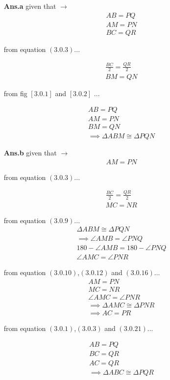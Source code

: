 \begin{enumerate}
	\item[\textbf{Ans.a}]	
	given that $\to$\\
	\begin{align}
	AB = PQ\\
	AM = PN\\
	BC = QR	
	\end{align}
	
	from equation $\left(3.0.3\right)$...
	
	\begin{align}
	\frac{BC}{2} = \frac{QR}{2} \\
	BM = QN
	\end{align}
	
	from fig $\left[3.0.1\right]$ and $\left[3.0.2\right]$ ...
	
	\begin{align}
	AB = PQ\\
	AM = PN\\
	BM = QN\\
	\implies  \Delta ABM \cong \Delta PQN
	\end{align}
	
	\item[\textbf{Ans.b}]
	given that $\to$\\
	\begin{align}
	AM = PN
	\end{align}
	
	from equation $\left(3.0.3\right)$...
	
	\begin{align}
	\frac{BC}{2} = \frac{QR}{2} \\
	MC = NR
	\end{align}
	
	
	from equation $\left(3.0.9\right)$...
	\begin{align}
	\Delta ABM \cong \Delta PQN 
	\\
	\implies \angle AMB = \angle PNQ
	\\
	180 - \angle AMB = 180 -  \angle PNQ
	\\
	\angle AMC = \angle PNR
	\end{align}
	
	from equation $\left(3.0.10\right)$,$\left(3.0.12\right)$ and $\left(3.0.16\right)$...
	\begin{align}
	AM = PN
	\\
	MC = NR
	\\
	\angle AMC = \angle PNR
	\\
	\implies  \Delta AMC \cong \Delta PNR
	\\
	\implies AC = PR
	\end{align}
	
	from equation $\left(3.0.1\right)$,$\left(3.0.3\right)$ and $\left(3.0.21\right)$...
	
	\begin{align}
	AB = PQ\\
	BC = QR\\
	AC = QR\\
	\implies  \Delta ABC \cong \Delta PQR
	\end{align}
\end{enumerate}